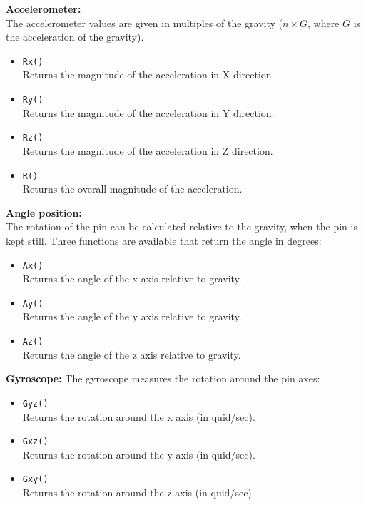 \documentclass[a4paper, twoside, final]{book}%
\begin{document}
\noindent \textbf{Accelerometer:}\\
The accelerometer values are given in multiples of the gravity ($n\times G$, where $G$ is the acceleration of the gravity).
\begin{itemize}
  \item \texttt{Rx()}\\
    Returns the magnitude of the acceleration in X direction.
  \item \texttt{Ry()}\\
    Returns the magnitude of the acceleration in Y direction.
  \item \texttt{Rz()}\\
    Returns the magnitude of the acceleration in Z direction.
  \item \texttt{R()}\\
    Returns the overall magnitude of the acceleration.
\end{itemize}

\noindent \textbf{Angle position:}\\
The rotation of the pin can be calculated relative to the gravity, when the pin is kept still.
Three functions are available that return the angle in degrees:
\begin{itemize}
  \item \texttt{Ax()}\\
    Returns the angle of the x axis relative to gravity.
  \item \texttt{Ay()}\\
    Returns the angle of the y axis relative to gravity.
  \item \texttt{Az()}\\
    Returns the angle of the z axis relative to gravity.
\end{itemize}

\noindent \textbf{Gyroscope:}
The gyroscope measures the rotation around the pin axes:
\begin{itemize}
  \item \texttt{Gyz()}\\
    Returns the rotation around the x axis (in quid/sec).
  \item \texttt{Gxz()}\\
    Returns the rotation around the y axis (in quid/sec).
  \item \texttt{Gxy()}\\
    Returns the rotation around the z axis (in quid/sec).
\end{itemize}
\end{document}
